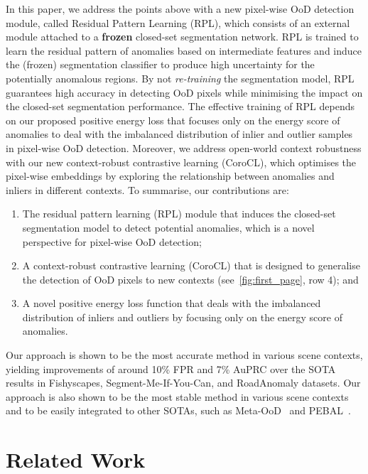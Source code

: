 \documentclass[10pt,twocolumn,letterpaper]{article}
\begin{document}
In this paper, we address the points above with a new pixel-wise OoD detection module, called Residual Pattern Learning (RPL), which consists of an external module 
attached to a \textbf{frozen} closed-set segmentation network. 
RPL is trained to learn the residual pattern of anomalies based on intermediate features
and induce the (frozen) segmentation classifier to produce high uncertainty for the potentially anomalous regions.
By not \textit{re-training} the segmentation model, RPL guarantees high accuracy in detecting OoD pixels while minimising the impact on the closed-set segmentation performance.
The effective training of RPL depends on our proposed positive energy loss that focuses only on the energy score of anomalies to deal 
with the imbalanced distribution of inlier and outlier samples in pixel-wise OoD detection.
Moreover, we address open-world context robustness with our new context-robust contrastive learning (CoroCL), which optimises the pixel-wise embeddings by exploring the relationship between anomalies and inliers in different contexts.
To summarise, our contributions are:
\begin{enumerate}
    \item The residual pattern learning (RPL) module that induces the closed-set segmentation model to detect potential anomalies, which is a novel perspective for pixel-wise OoD detection; 
\item A context-robust contrastive learning (CoroCL) that is designed to generalise the detection of OoD pixels 
    to new contexts (see~\cref{fig:first_page}, row 4); and 
    \item A novel positive energy loss function that deals with the imbalanced distribution of inliers and outliers by focusing only on the energy score of anomalies.
\end{enumerate}
Our approach is shown to be the most  accurate method in various scene contexts, yielding improvements of around  10\% FPR and 7\% AuPRC over the SOTA results in Fishyscapes, Segment-Me-If-You-Can, and RoadAnomaly datasets. Our approach is also shown to be the most stable method in various scene contexts and to be easily integrated to other SOTAs, such as Meta-OoD~\cite{chan2021entropy} and PEBAL~\cite{tian2021pixel}. 












\section{Related Work}
\label{sec:related_work}
\end{document}
